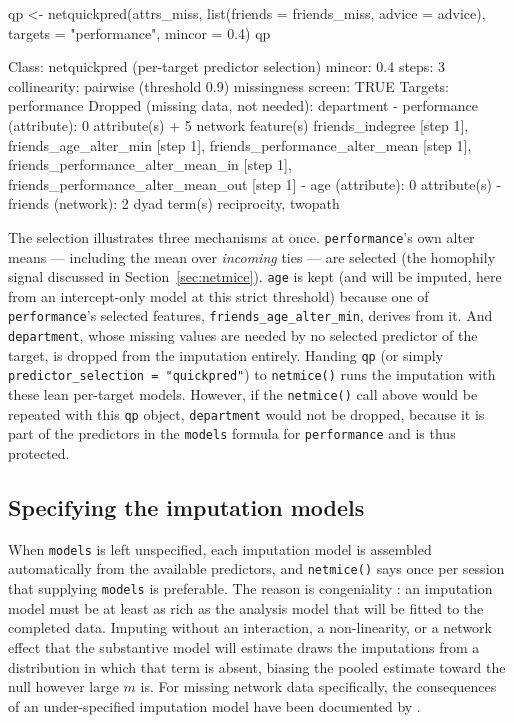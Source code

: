 \documentclass[11pt,a4paper]{article}
\newcommand{\code}[1]{\texttt{#1}}
\begin{document}
\begin{Rinput}
qp <- netquickpred(attrs_miss,
                   list(friends = friends_miss, advice = advice),
                   targets = "performance", mincor = 0.4)
qp
\end{Rinput}

\begin{Routput}
Class: netquickpred (per-target predictor selection)
mincor: 0.4  steps: 3  collinearity: pairwise (threshold 0.9)
missingness screen: TRUE
Targets: performance
Dropped (missing data, not needed): department
- performance (attribute): 0 attribute(s) + 5 network feature(s)
    friends_indegree [step 1], friends_age_alter_min [step 1],
    friends_performance_alter_mean [step 1],
    friends_performance_alter_mean_in [step 1],
    friends_performance_alter_mean_out [step 1]
- age (attribute): 0 attribute(s)
- friends (network): 2 dyad term(s)
    reciprocity, twopath
\end{Routput}

The selection illustrates three mechanisms at once. \code{performance}'s
own alter means --- including the mean over \emph{incoming} ties --- are
selected (the homophily signal discussed in
Section~\ref{sec:netmice}). \code{age} is kept (and will be imputed, here
from an intercept-only model at this strict threshold) because one of
\code{performance}'s selected features, \code{friends\_age\_alter\_min},
derives from it. And \code{department}, whose missing values are needed by
no selected predictor of the target, is dropped from the imputation
entirely. Handing \code{qp} (or simply \code{predictor\_selection =
"quickpred"}) to \code{netmice()} runs the imputation with these lean
per-target models. However, if the \code{netmice()} call above would be repeated
with this \code{qp} object, \code{department} would not be dropped, because it
is part of the predictors in the \code{models} formula for \code{performance}
and is thus protected.

\subsection{Specifying the imputation models}
\label{sec:congeniality}

When \code{models} is left unspecified, each imputation model is assembled
automatically from the available predictors, and \code{netmice()} says once per
session that supplying \code{models} is preferable. The reason is
congeniality \citep{Meng1994}: an imputation model must be at least as rich as
the analysis model that will be fitted to the completed data. Imputing without
an interaction, a non-linearity, or a network effect that the substantive
model will estimate draws the imputations from a distribution in which that
term is absent, biasing the pooled estimate toward the null however large $m$
is. For missing network data specifically, the consequences of an
under-specified imputation model have been documented by \citet{Krause2020}.
\end{document}
